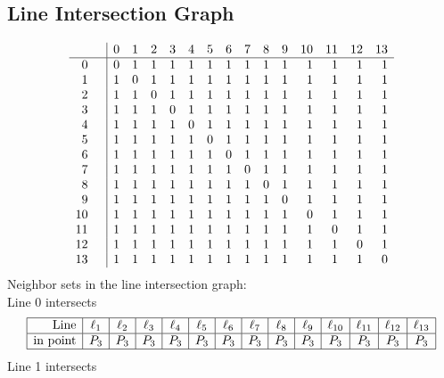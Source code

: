 \documentclass{article}
\begin{document}
{\subsection*{Line Intersection Graph}
{\arraycolsep=1pt
$$
\begin{array}{rr|*{14}r}
 &  & 0 & 1 & 2 & 3 & 4 & 5 & 6 & 7 & 8 & 9 & 10 & 11 & 12 & 13\\
\hline
0 &  & 0 & 1 & 1 & 1 & 1 & 1 & 1 & 1 & 1 & 1 & 1 & 1 & 1 & 1\\
1 &  & 1 & 0 & 1 & 1 & 1 & 1 & 1 & 1 & 1 & 1 & 1 & 1 & 1 & 1\\
2 &  & 1 & 1 & 0 & 1 & 1 & 1 & 1 & 1 & 1 & 1 & 1 & 1 & 1 & 1\\
3 &  & 1 & 1 & 1 & 0 & 1 & 1 & 1 & 1 & 1 & 1 & 1 & 1 & 1 & 1\\
4 &  & 1 & 1 & 1 & 1 & 0 & 1 & 1 & 1 & 1 & 1 & 1 & 1 & 1 & 1\\
5 &  & 1 & 1 & 1 & 1 & 1 & 0 & 1 & 1 & 1 & 1 & 1 & 1 & 1 & 1\\
6 &  & 1 & 1 & 1 & 1 & 1 & 1 & 0 & 1 & 1 & 1 & 1 & 1 & 1 & 1\\
7 &  & 1 & 1 & 1 & 1 & 1 & 1 & 1 & 0 & 1 & 1 & 1 & 1 & 1 & 1\\
8 &  & 1 & 1 & 1 & 1 & 1 & 1 & 1 & 1 & 0 & 1 & 1 & 1 & 1 & 1\\
9 &  & 1 & 1 & 1 & 1 & 1 & 1 & 1 & 1 & 1 & 0 & 1 & 1 & 1 & 1\\
10 &  & 1 & 1 & 1 & 1 & 1 & 1 & 1 & 1 & 1 & 1 & 0 & 1 & 1 & 1\\
11 &  & 1 & 1 & 1 & 1 & 1 & 1 & 1 & 1 & 1 & 1 & 1 & 0 & 1 & 1\\
12 &  & 1 & 1 & 1 & 1 & 1 & 1 & 1 & 1 & 1 & 1 & 1 & 1 & 0 & 1\\
13 &  & 1 & 1 & 1 & 1 & 1 & 1 & 1 & 1 & 1 & 1 & 1 & 1 & 1 & 0\\
\end{array}
$$
}%
Neighbor sets in the line intersection graph:\\
Line 0 intersects 
$$
\begin{array}{|r*{13}{|c}|}
\hline
\mbox{Line}  & \ell_{1} & \ell_{2} & \ell_{3} & \ell_{4} & \ell_{5} & \ell_{6} & \ell_{7} & \ell_{8} & \ell_{9} & \ell_{10} & \ell_{11} & \ell_{12} & \ell_{13}\\
\hline
\mbox{in point}  & P_{3} & P_{3} & P_{3} & P_{3} & P_{3} & P_{3} & P_{3} & P_{3} & P_{3} & P_{3} & P_{3} & P_{3} & P_{3}\\
\hline
\end{array}
$$
Line 1 intersects 
$$
\begin{array}{|r*{13}{|c}|}

\end{array}$$}
\end{document}
